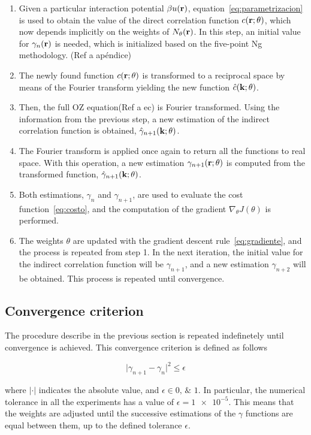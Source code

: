 \begin{enumerate}
    \item Given a particular interaction potential $\beta u(\mathbf{r})$, equation~\eqref{eq:parametrizacion} is used to obtain the value of the direct correlation function $c(\mathbf{r}; \theta)$, which now depends implicitly on the weights of $N_{\theta}(\mathbf{r})$. In this step, an initial value for $\gamma_{n}(\mathbf{r})$ is needed, which is initialized based on the five-point Ng methodology. (Ref a apéndice)
    \item The newly found function $c(\mathbf{r}; \theta)$ is transformed to a reciprocal space by means of the Fourier transform yielding the new function $\hat{c}(\mathbf{k}; \theta)$.
    \item Then, the full OZ equation(Ref a ec) is Fourier transformed. Using the information from the previous step, a new estimation of the indirect correlation function is obtained, $\hat{\gamma}_{n+1}(\mathbf{k}; \theta)$.
    \item The Fourier transform is applied once again to return all the functions to real space. With this operation, a new estimation $\gamma_{n+1}(\mathbf{r}; \theta)$ is computed from the transformed function, $\hat{\gamma}_{n+1}(\mathbf{k}; \theta)$.
    \item Both estimations, $\gamma_{n}$ and $\gamma_{n+1}$, are used to evaluate the cost function~\eqref{eq:costo}, and the computation of the gradient $\nabla_{\theta} J(\theta)$ is performed.
    \item The weights $\theta$ are updated with the gradient descent rule~\eqref{eq:gradiente}, and the process is repeated from step 1. In the next iteration, the initial value for the indirect correlation function will be $\gamma_{n+1}$, and a new estimation $\gamma_{n+2}$ will be obtained. This process is repeated until convergence.
\end{enumerate}

\subsection{Convergence criterion}
The procedure describe in the previous section is repeated indefinetely until convergence
is achieved. This convergence criterion is defined as follows

\begin{equation}
    {\lvert \gamma_{n+1} - \gamma_{n} \rvert}^2 \leq \epsilon
    \label{eq:tolerancia}
\end{equation}

where $\lvert \cdot \rvert$ indicates the absolute value, and $\epsilon \in \numlist{0; 1}$.
In particular, the numerical tolerance in all the experiments has a value of $\epsilon = \num{1e-5}$.
This means that the weights are adjusted until the successive estimations of the $\gamma$
functions are equal between them, up to the defined tolerance $\epsilon$.

